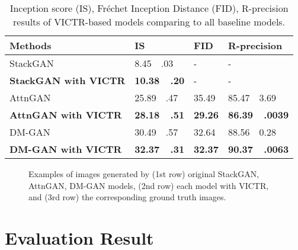 \documentclass[11pt]{article}
\begin{document}
\begin{table}[t]
    \centering
    \small
    \begin{tabular}{|p{3.5cm}|p{1.8cm}|p{1.8cm}|p{1.8cm}|}
    \hline 
    \bf{Methods} & \bf{IS} & \bf{FID} & \bf{R-precision} \\
    \hline
    StackGAN & 8.45~~.03& - & - \\
        \bf{StackGAN with VICTR} & \bf{10.38~~.20} & - & - \\
    \Xhline{1pt}
    AttnGAN & 25.89~~.47& 35.49& 85.47~~3.69 \\
        \bf{AttnGAN with VICTR}  & \bf{28.18~~.51} & \bf{29.26}& \bf{86.39~~.0039} \\
    \Xhline{1pt}
    DM-GAN & 30.49~~.57& 32.64& 88.56~~0.28\\
        \bf{DM-GAN with VICTR} & \bf{32.37~~.31} & \bf{32.37}& \bf{90.37~~.0063} \\
    \hline
    \end{tabular}
    \caption{\label{tab:result_table} Inception score (IS), Fréchet Inception Distance (FID), R-precision results of VICTR-based models comparing to all baseline models.}
    \vspace{-4mm}
\end{table}



\begin{figure*}[t]
\centering
{}
\label{fig:comparision_a}
\label{fig:comparision_b}
\label{fig:comparision_c}
  \caption{Examples of images generated by (1st row) original StackGAN, AttnGAN, DM-GAN models, (2nd row) each model with VICTR, and (3rd row) the corresponding ground truth images.}
  \label{fig:comparison_stack}
  \vspace{-4mm}
\end{figure*}


\section{Evaluation Result}
\end{document}
